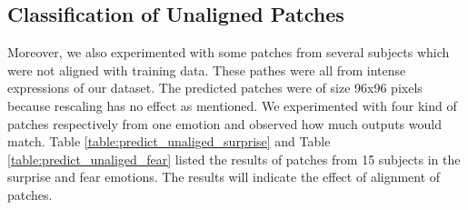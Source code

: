 \subsection{Classification of Unaligned Patches}
Moreover, we also experimented with some patches from several subjects which were not aligned with training data. These pathes were all from intense expressions of our dataset. The predicted patches were of size 96x96 pixels because rescaling has no effect as mentioned. We experimented with four kind of patches respectively from one emotion and observed how much outputs would match. Table \ref{table:predict_unaliged_surprise} and Table \ref{table:predict_unaliged_fear} listed the results of patches from 15 subjects in the surprise and fear emotions. The results will indicate the effect of alignment of patches.


